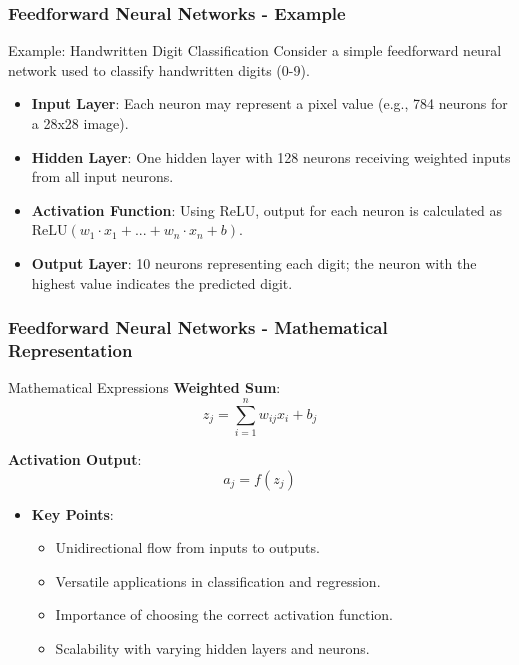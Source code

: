 \documentclass[aspectratio=169]{beamer}
\begin{document}
\begin{frame}[fragile]
    \frametitle{Feedforward Neural Networks - Example}
    \begin{block}{Example: Handwritten Digit Classification}
        Consider a simple feedforward neural network used to classify handwritten digits (0-9).
    \end{block}
    
    \begin{itemize}
        \item \textbf{Input Layer}: Each neuron may represent a pixel value (e.g., 784 neurons for a 28x28 image).
        \item \textbf{Hidden Layer}: One hidden layer with 128 neurons receiving weighted inputs from all input neurons.
        \item \textbf{Activation Function}: Using ReLU, output for each neuron is calculated as \( \text{ReLU}(w_1 \cdot x_1 + ... + w_n \cdot x_n + b) \).
        \item \textbf{Output Layer}: 10 neurons representing each digit; the neuron with the highest value indicates the predicted digit.
    \end{itemize}
\end{frame}

\begin{frame}[fragile]
    \frametitle{Feedforward Neural Networks - Mathematical Representation}
    \begin{block}{Mathematical Expressions}
        \textbf{Weighted Sum}:
        \begin{equation}
            z_j = \sum_{i=1}^{n} w_{ij} x_i + b_j
        \end{equation}
        
        \textbf{Activation Output}:
        \begin{equation}
            a_j = f(z_j)
        \end{equation}
    \end{block}
    
    \begin{itemize}
        \item \textbf{Key Points}:
            \begin{itemize}
                \item Unidirectional flow from inputs to outputs.
                \item Versatile applications in classification and regression.
                \item Importance of choosing the correct activation function.
                \item Scalability with varying hidden layers and neurons.
            \end{itemize}
    \end{itemize}
\end{frame}
\end{document}
